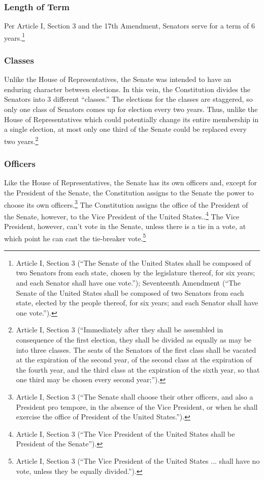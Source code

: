 \subsubsection{Length of Term}
Per Article I, Section 3 and the 17th Amendment, Senators serve for a term of 6 years.\footnote{Article I, Section 3 (``The Senate of the United States shall be composed of two Senators from each state, chosen by the legislature thereof, for six years; and each Senator shall have one vote.''); 
Seventeenth Amendment (``The Senate of the United States shall be composed of two Senators from each state, elected by the people thereof, for six years; and each Senator shall have one vote.'').}

\subsubsection{Classes}
Unlike the House of Representatives, the Senate was intended to have an enduring character between elections.  In this vein, the Constitution divides the Senators into 3 different ``classes.'' The elections for the classes are staggered, so only one class of Senators comes up for election every two years.  Thus, unlike the House of Representatives which could potentially change its entire membership in a single election, at most only one third of the Senate could be replaced every two years.\footnote{Article I, Section 3 (``Immediately after they shall be assembled in consequence of the first election, they shall be divided as equally as may be into three classes. The seats of the Senators of the first class shall be vacated at the expiration of the second year, of the second class at the expiration of the fourth year, and the third class at the expiration of the sixth year, so that one third may be chosen every second year;'').}

\subsubsection{Officers}
Like the House of Representatives, the Senate has its own officers and, except for the President of the Senate, the Constitution assigns to the Senate the power to choose its own officers.\footnote{Article I, Section 3 (``The Senate shall choose their other officers, and also a President pro tempore, in the absence of the Vice President, or when he shall exercise the office of President of the United States.'').}
The Constitution assigns the office of the President of the Senate, however, to the Vice President of the United States..\footnote{Article I, Section 3 (``The Vice President of the United States shall be President of the Senate'').}
The Vice President, however, can't vote in the Senate, unless there is a tie in a vote, at which point he can cast the tie-breaker vote.\footnote{Article I, Section 3 (``The Vice President of the United States ... shall have no vote, unless they be equally divided.'').}

